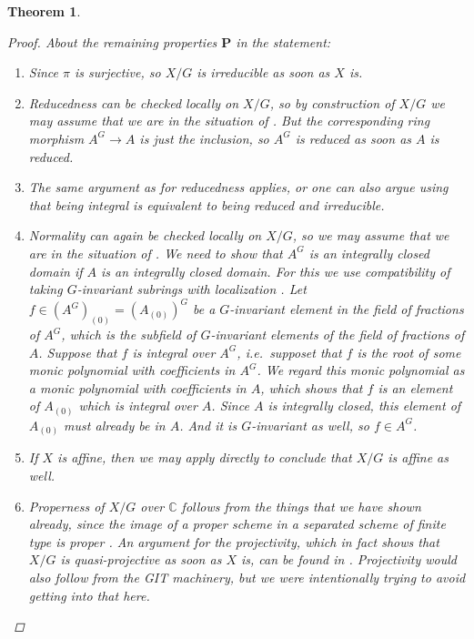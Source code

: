 \documentclass[12pt,a4paper]{amsart}
\theoremstyle{plain}
\newtheorem{thm}{Theorem}[section]
\theoremstyle{definition}
\theoremstyle{remark}
\begin{document}
\begin{thm}
\begin{proof}
    About the remaining properties $\mathbf{P}$ in the statement:
    \begin{enumerate}[label=(\alph*)]
      \item Since $\pi$ is surjective, so $X/G$ is irreducible as soon as $X$ is.
      \item Reducedness can be checked locally on $X/G$, so by construction of $X/G$ we may assume that we are in the situation of .
        But the corresponding ring morphism $A^{G} \to A$ is just the inclusion, so $A^{G}$ is reduced as soon as $A$ is reduced.
      \item The same argument as for reducedness applies, or one can also argue using that being integral is equivalent to being reduced and irreducible.
      \item Normality can again be checked locally on $X/G$, so we may assume that we are in the situation of .
        We need to show that $A^{G}$ is an integrally closed domain if $A$ is an integrally closed domain.
        For this we use compatibility of taking $G$-invariant subrings with localization \cite[Exercise 5.12]{am69}.
        Let $f \in (A^{G})_{(0)} = (A_{(0)})^{G}$ be a $G$-invariant element in the field of fractions of $A^{G}$, which is the subfield of $G$-invariant elements of the field of fractions of $A$.
        Suppose that $f$ is integral over $A^{G}$, i.e.~supposet that $f$ is the root of some monic polynomial with coefficients in $A^{G}$.
        We regard this monic polynomial as a monic polynomial with coefficients in $A$, which shows that $f$ is an element of $A_{(0)}$ which is integral over $A$.
        Since $A$ is integrally closed, this element of $A_{(0)}$ must already be in $A$.
        And it is $G$-invariant as well, so $f \in A^{G}$.
      \item If $X$ is affine, then we may apply  directly to conclude that $X/G$ is affine as well.
      \item Properness of $X/G$ over $\mathbb{C}$ follows from the things that we have shown already, since the image of a proper scheme in a separated scheme of finite type is proper \cite[\href{https://stacks.math.columbia.edu/tag/03GN}{Tag 03GN}]{stacks-project}.
        An argument for the projectivity, which in fact shows that $X/G$ is quasi-projective as soon as $X$ is, can be found in \cite[Proposition IV.1.5]{knu71}.
        Projectivity would also follow from the GIT machinery, but we were intentionally trying to avoid getting into that here.
    \end{enumerate}
  \end{proof}
\end{thm}



\vfill
\end{document}
